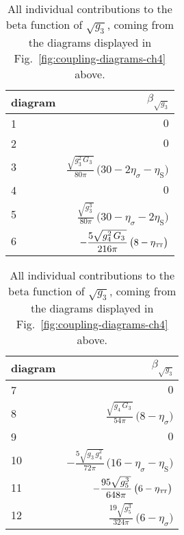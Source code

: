 \documentclass[11pt]{book} %
\newcommand\TTspace{ -1pt }
\newcommand\etaTT{ \eta_{\scriptscriptstyle{\mathrm{T\hspace{\TTspace}T}}} }
\newcommand\etaS{ \eta_{\scriptscriptstyle{\mathrm{S}}} }
\numberwithin{equation}{chapter}
\begin{document}
{
  \setlength{\extrarowheight}{10pt}
  \begin{table}[p]
    \begin{center}
      \begin{tabular}{ l r }
        \toprule
        diagram &  $\beta_{\sqrt{g_3}}$ \\
        \midrule
         1 &  $\displaystyle 0$ \\
         2 &  $\displaystyle 0$ \\
         3 &  $\displaystyle \frac{\sqrt{g_3^2 \, G_3 \,}}{80\pi} \, \big( 30 - 2\eta_\sigma - \etaS \big)$ \\
         4 &  $\displaystyle 0$ \\
         5 &  $\displaystyle \frac{\sqrt{g_3^3 \,}}{80 \pi} \, \big( 30 -\eta_\sigma - 2 \etaS \big)$ \\
         6 &  $\displaystyle -\frac{5 \sqrt{g_4^2 \, G_3 \,}}{216 \pi}  \, \big( 8 - \etaTT \big)$ \\
        \bottomrule
      \end{tabular}
      \hspace{3mm}
      \begin{tabular}{ l r }
        \toprule
        diagram &  $\beta_{\sqrt{g_3}}$ \\
        \midrule
         7 & $\displaystyle 0$ \\
         8 & $\displaystyle \frac{\sqrt{g_4 \, G_3 \,}}{54 \pi} \, \big( 8 - \eta_\sigma \big)$ \\
         9 & $\displaystyle 0$ \\
        10 & $\displaystyle -\frac{5 \sqrt{g_3 \, g_4^2 \,}}{72 \pi} \, \big( 16 - \eta_\sigma - \etaS \big)$ \\
        11 & $\displaystyle -\frac{95 \sqrt{g_5^3 \,}}{648 \pi} \, \big( 6 - \etaTT \big)$ \\
        12 & $\displaystyle \frac{19 \sqrt{g_5^3\,}}{324 \pi} \, \big( 6 - \eta_\sigma \big)$ \\
        \bottomrule
      \end{tabular}
    \end{center}
    \caption[Coordinates and critical exponents of fixed points in perturbative approximation]
    {
      All individual contributions to the beta function of $\sqrt{g_3}$,
      coming from the diagrams displayed in Fig.~\ref{fig:coupling-diagrams-ch4} above.
    }
    \label{tab:beta_function_results}
  \end{table}
}


\end{document}
